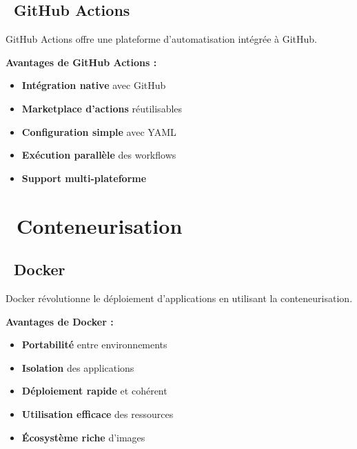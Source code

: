 \subsection{\faGithub\ GitHub Actions}

GitHub Actions offre une plateforme d'automatisation intégrée à GitHub.

\textbf{\color{primaryblue}Avantages de GitHub Actions :}
\begin{itemize}
    \item \textcolor{primaryblue}{\textbf{Intégration native}} avec GitHub
    \item \textcolor{primaryblue}{\textbf{Marketplace d'actions}} réutilisables
    \item \textcolor{primaryblue}{\textbf{Configuration simple}} avec YAML
    \item \textcolor{primaryblue}{\textbf{Exécution parallèle}} des workflows
    \item \textcolor{primaryblue}{\textbf{Support multi-plateforme}}
\end{itemize}

\section{\faDocker\ Conteneurisation}

\subsection{\faDocker\ Docker}

\begin{infobox}
Docker révolutionne le déploiement d'applications en utilisant la conteneurisation.
\end{infobox}

\textbf{\color{primaryblue}Avantages de Docker :}
\begin{itemize}
    \item \textcolor{accentgreen}{\textbf{Portabilité}} entre environnements
    \item \textcolor{accentgreen}{\textbf{Isolation}} des applications
    \item \textcolor{accentgreen}{\textbf{Déploiement rapide}} et cohérent
    \item \textcolor{accentgreen}{\textbf{Utilisation efficace}} des ressources
    \item \textcolor{accentgreen}{\textbf{Écosystème riche}} d'images
\end{itemize}

